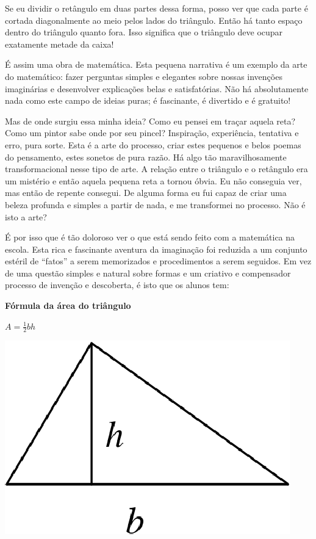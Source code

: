 \documentclass[a4paper,oneside,10pt,notitlepage]{article}
\begin{document}
Se eu dividir o retângulo em duas partes dessa forma, posso ver que cada parte é cortada diagonalmente ao meio pelos lados do triângulo.
Então há tanto espaço dentro do triângulo quanto fora.
Isso significa que o triângulo deve ocupar exatamente metade da caixa!

É assim uma obra de matemática.
Esta pequena narrativa é um exemplo da arte do matemático: fazer perguntas simples e elegantes sobre nossas invenções imaginárias e desenvolver explicações belas e satisfatórias.
Não há absolutamente nada como este campo de ideias puras; é fascinante, é divertido e é gratuito! %

Mas de onde surgiu essa minha ideia?
Como eu pensei em traçar aquela reta?
Como um pintor sabe onde por seu pincel?
Inspiração, experiência, tentativa e erro, pura sorte.
Esta é a arte do processo, criar estes pequenos e belos poemas do pensamento, estes sonetos de pura razão. %
Há algo tão maravilhosamente transformacional nesse tipo de arte.
A relação entre o triângulo e o retângulo era um mistério e então aquela pequena reta a tornou óbvia.
Eu não conseguia ver, mas então de repente consegui.
De alguma forma eu fui capaz de criar uma beleza profunda e simples a partir de nada, e me transformei no processo.
Não é isto a arte? %

É por isso que é tão doloroso ver o que está sendo feito com a matemática na escola.
Esta rica e fascinante aventura da imaginação foi reduzida a um conjunto estéril de ``fatos'' a serem memorizados e procedimentos a serem seguidos.
Em vez de uma questão simples e natural sobre formas e um criativo e compensador processo de invenção e descoberta, é isto que os alunos tem:

\vspace{1em}

\begin{minipage}[c]{0.45\linewidth}
	\centering
	\textbf{Fórmula da área do triângulo}

	$A=\frac12 b h$
\end{minipage}
\hspace{0.5em}
\begin{minipage}[c]{0.45\linewidth}
	\centering
	\includegraphics{triangle2.eps}
\end{minipage}
\end{document}
